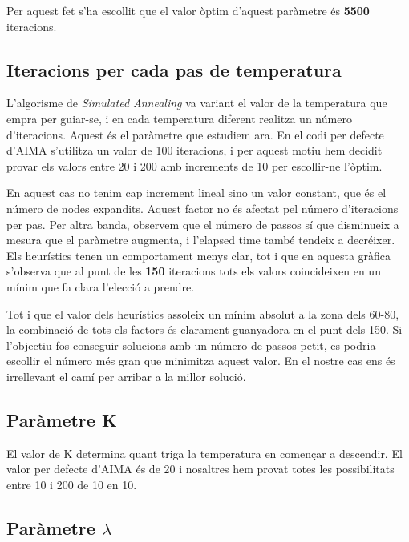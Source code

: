 Per aquest fet s'ha escollit que el valor òptim d'aquest paràmetre és \textbf{5500} iteracions.


\newpage
\subsection{Iteracions per cada pas de temperatura} %
\label{sub:iteracions_per_cada_pas}

L'algorisme de \emph{Simulated Annealing} va variant el valor de la temperatura que empra per guiar-se, i en cada temperatura diferent realitza un número d'iteracions. Aquest és el paràmetre que estudiem ara. En el codi per defecte d'AIMA s'utilitza un valor de 100 iteracions, i per aquest motiu hem decidit provar els valors entre 20 i 200 amb increments de 10 per escollir-ne l'òptim.


En aquest cas no tenim cap increment lineal sino un valor constant, que és el número de nodes expandits. Aquest factor no és afectat pel número d'iteracions per pas. Per altra banda, observem que el número de passos sí que disminueix a mesura que el paràmetre augmenta, i l'elapsed time també tendeix a decréixer. Els heurístics tenen un comportament menys clar, tot i que en aquesta gràfica s'observa que al punt de les \textbf{150} iteracions tots els valors coincideixen en un mínim que fa clara l'elecció a prendre.

Tot i que el valor dels heurístics assoleix un mínim absolut a la zona dels 60-80, la combinació de tots els factors és clarament guanyadora en el punt dels 150. Si l'objectiu fos conseguir solucions amb un número de passos petit, es podria escollir el número més gran que minimitza aquest valor. En el nostre cas ens és irrellevant el camí per arribar a la millor solució.


\newpage
\subsection{Paràmetre K} %
\label{sub:parametre_k}

El valor de K determina quant triga la temperatura en començar a descendir. El valor per defecte d'AIMA és de 20 i nosaltres hem provat totes les possibilitats entre 10 i 200 de 10 en 10.




\newpage
\subsection{Paràmetre $\lambda$} %
\label{sub:parametre_lambda}


\newpage

